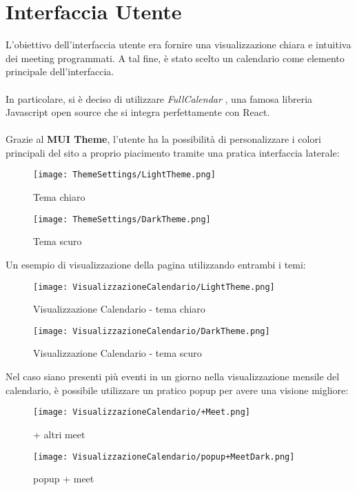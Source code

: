 \section{Interfaccia Utente}
L'obiettivo dell'interfaccia utente era fornire una visualizzazione chiara e intuitiva dei meeting programmati. 
A tal fine, è stato scelto un calendario come elemento principale dell'interfaccia.
\\\\
In particolare, si è deciso di utilizzare \textit{FullCalendar} \cite{FullCalendarSite},
una famosa libreria Javascript open source che si integra perfettamente con React.
\\\\
Grazie al \textbf{MUI Theme}, l'utente ha la possibilità di personalizzare i colori 
principali del sito a proprio piacimento tramite una pratica interfaccia laterale:
\begin{figure}[H]
    \centering
    \begin{minipage}{0.45\textwidth}
        \centering
        \texttt{[image: ThemeSettings/LightTheme.png]}
        \caption{Tema chiaro}
    \end{minipage}
    \hspace{0.05\textwidth}
    \begin{minipage}{0.45\textwidth}
        \centering
        \texttt{[image: ThemeSettings/DarkTheme.png]}
        \caption{Tema scuro}
    \end{minipage}
\end{figure}
\clearpage
\noindent Un esempio di visualizzazione della pagina utilizzando entrambi i temi:
\begin{figure}[H]
    \centering
    \texttt{[image: VisualizzazioneCalendario/LightTheme.png]}
    \caption{Visualizzazione Calendario - tema chiaro}
\end{figure}
\begin{figure}[H]
    \centering
    \texttt{[image: VisualizzazioneCalendario/DarkTheme.png]}
    \caption{Visualizzazione Calendario - tema scuro}
\end{figure}
\noindent  Nel caso siano presenti più eventi in un giorno nella visualizzazione mensile 
del calendario, è possibile utilizzare un pratico popup per avere una visione migliore:
\begin{figure}[H]
    \centering
    \begin{minipage}{0.45\textwidth}
        \centering
        \texttt{[image: VisualizzazioneCalendario/+Meet.png]}
        \caption{+ altri meet}
    \end{minipage}
    \hspace{0.05\textwidth}
    \begin{minipage}{0.45\textwidth}
        \centering
        \texttt{[image: VisualizzazioneCalendario/popup+MeetDark.png]}
        \caption{popup + meet}
    \end{minipage}
\end{figure}
